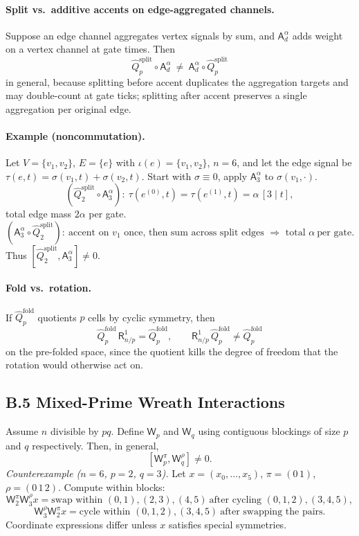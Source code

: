 \documentclass[12pt]{article}
\numberwithin{equation}{section}
\theoremstyle{plain}
\theoremstyle{definition}
\theoremstyle{remark}
\begin{document}
\paragraph{Split vs.\ additive accents on edge-aggregated channels.}
Suppose an edge channel aggregates vertex signals by sum, and $\mathsf{A}_d^{\alpha}$ adds weight on a vertex channel at gate times. Then
\[
\hat{Q}_p^{\mathrm{split}}\circ \mathsf{A}_d^{\alpha} \ \neq\ \mathsf{A}_d^{\alpha}\circ \hat{Q}_p^{\mathrm{split}}
\]
in general, because splitting before accent duplicates the aggregation targets and may double-count at gate ticks; splitting after accent preserves a single aggregation per original edge.

\paragraph{Example (noncommutation).}
Let $V=\{v_1,v_2\}$, $E=\{e\}$ with $\iota(e)=\{v_1,v_2\}$, $n=6$, and let the edge signal be $\tau(e,t)=\sigma(v_1,t)+\sigma(v_2,t)$. Start with $\sigma\equiv 0$, apply $\mathsf{A}_3^{\alpha}$ to $\sigma(v_1,\cdot)$.
\[
(\hat{Q}_2^{\mathrm{split}}\circ \mathsf{A}_3^{\alpha}):\ 
\tau(e^{(0)},t)=\tau(e^{(1)},t)=\alpha\,[3\mid t],
\]
total edge mass $2\alpha$ per gate.
\[
(\mathsf{A}_3^{\alpha}\circ \hat{Q}_2^{\mathrm{split}}):\ 
\text{accent on } v_1 \text{ once, then sum across split edges } \Rightarrow \text{ total } \alpha\ \text{per gate.}
\]
Thus $[\hat{Q}_2^{\mathrm{split}},\mathsf{A}_3^{\alpha}]\neq 0$.

\paragraph{Fold vs.\ rotation.}
If $\hat{Q}_p^{\mathrm{fold}}$ quotients $p$ cells by cyclic symmetry, then
\[
\hat{Q}_p^{\mathrm{fold}}\,\mathsf{R}_{n/p}^{1}=\hat{Q}_p^{\mathrm{fold}},\qquad
\mathsf{R}_{n/p}^{1}\,\hat{Q}_p^{\mathrm{fold}} \neq \hat{Q}_p^{\mathrm{fold}}
\]
on the pre-folded space, since the quotient kills the degree of freedom that the rotation would otherwise act on.

\subsection*{B.5 Mixed-Prime Wreath Interactions}
Assume $n$ divisible by $pq$. Define $\mathsf{W}_{p}$ and $\mathsf{W}_{q}$ using contiguous blockings of size $p$ and $q$ respectively. Then, in general,
\[
[\mathsf{W}_p^{\pi},\mathsf{W}_q^{\rho}]\neq 0.
\]
\textit{Counterexample ($n=6$, $p=2$, $q=3$).} Let $x=(x_0,\ldots,x_5)$, $\pi=(0\,1)$, $\rho=(0\,1\,2)$.
Compute within blocks:
\[
\mathsf{W}_2^{\pi}\mathsf{W}_3^{\rho}x = 
\text{swap within }(0,1),(2,3),(4,5)\ \text{after cycling }(0,1,2),(3,4,5),
\]
\[
\mathsf{W}_3^{\rho}\mathsf{W}_2^{\pi}x = 
\text{cycle within }(0,1,2),(3,4,5)\ \text{after swapping the pairs}.
\]
Coordinate expressions differ unless $x$ satisfies special symmetries.
\end{document}
